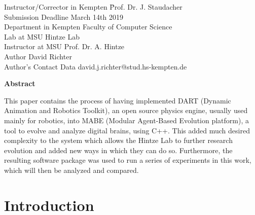\documentclass[12pt,oneside,listof=totoc,paper=a4,headings=small]{scrbook}
\begin{document}
\parbox{120mm}{
\begin{tabbing}
Instructor/Corrector in Kempten \hspace{1.45cm} \= Prof. Dr. J. Staudacher\\
Submission Deadline                        \> March 14th 2019\\
Department in Kempten                  \> Faculty of Computer Science\\
Lab at MSU \> Hintze Lab\\
Instructor at MSU                   \>Prof. Dr. A. Hintze\\
Author                              \> David Richter \\

Author's Contact Data               \> david.j.richter@stud.hs-kempten.de
\end{tabbing}
}

\newpage

\vspace*{1cm}

\begin{center}
    \textbf{Abstract}
\end{center}

\vspace*{1cm}

\noindent
This paper contains the process of having implemented DART (Dynamic Animation and Robotics Toolkit), an open source physics engine, usually used mainly for robotics, into MABE (Modular Agent-Based Evolution platform), a tool to evolve and analyze digital brains, using C++. This added much desired complexity to the system which allows the Hintze Lab to further research evolution and added new ways in which they can do so. Furthermore, the resulting software package was used to run a series of experiments in this work, which will then be analyzed and compared.


\tableofcontents
\listoffigures
\lstlistoflistings
\listoftables

\clearpage
\mainmatter
\setcounter{page}{1}

\chapter{Introduction}
\end{document}
